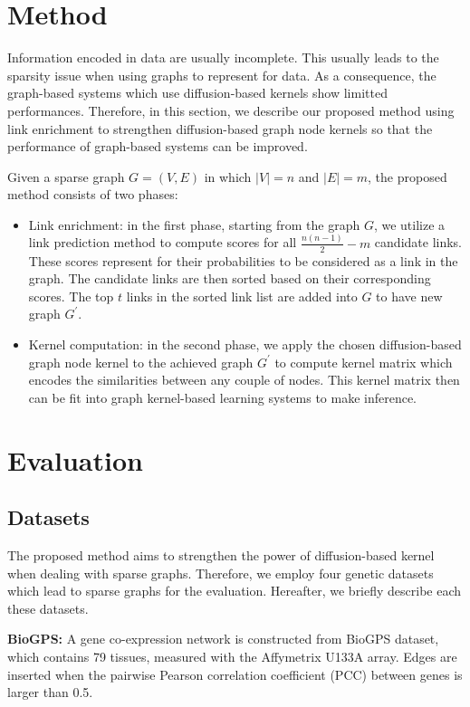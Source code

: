 \documentclass[runningheads,a4paper]{llncs}
\begin{document}
\section{Method}
\label{method}
Information encoded in data are usually incomplete. This usually leads to the sparsity issue when using graphs to represent for data. As a consequence, the graph-based systems which use diffusion-based kernels show limitted performances. Therefore, in this section, we describe our proposed method using link enrichment to strengthen diffusion-based graph node kernels so that the performance of graph-based systems can be improved.

Given a sparse graph $G=(V, E)$ in which $|V| = n$ and $|E| = m$, the proposed method consists of two phases:
\begin{itemize}
\item Link enrichment: in the first phase, starting from the graph $G$, we utilize a link prediction method to compute scores for all $\frac{n(n-1)}{2}-m$ candidate links. These scores represent for their probabilities to be considered as a link in the graph. The candidate links are then sorted based on their corresponding scores. The top $t$ links in the sorted link list are added into $G$ to have new graph $G^{'}$.
\item Kernel computation: in the second phase, we apply the chosen diffusion-based graph node kernel to the achieved graph $G^{'}$ to compute kernel matrix which encodes the similarities between any couple of nodes. This kernel matrix then can be fit into graph kernel-based learning systems to make inference.
\end{itemize}
\section{Evaluation}
\label{evaluation}
\subsection{Datasets}
The proposed method aims to strengthen the power of diffusion-based kernel when dealing with sparse graphs. Therefore, we employ four genetic datasets which lead to sparse graphs for the evaluation. Hereafter, we briefly describe each these datasets.

\textbf{BioGPS:} A gene co-expression network is constructed from BioGPS dataset, which contains 79 tissues, measured with the Affymetrix U133A array. Edges are inserted when the pairwise Pearson correlation coefficient (PCC) between genes is larger than 0.5.
\end{document}
